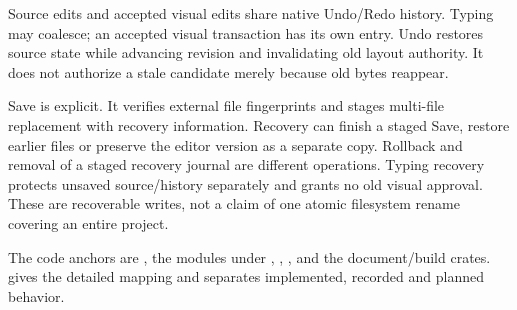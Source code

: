 Source edits and accepted visual edits share native Undo/Redo history. Typing
may coalesce; an accepted visual transaction has its own entry. Undo restores
source state while advancing revision and invalidating old layout authority.
It does not authorize a stale candidate merely because old bytes reappear.

Save is explicit. It verifies external file fingerprints and stages multi-file
replacement with recovery information. Recovery can finish a staged Save,
restore earlier files or preserve the editor version as a separate copy.
Rollback and removal of a staged recovery journal are different operations.
Typing recovery protects unsaved source/history separately and grants no old
visual approval. These are recoverable writes, not a claim of one atomic
filesystem rename covering an entire project.

The code anchors are , the modules under ,
, ,
and the document/build crates.  gives
the detailed mapping and separates implemented, recorded and planned behavior.
